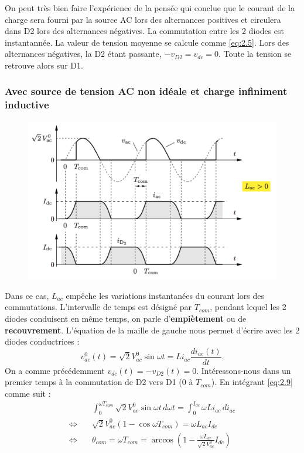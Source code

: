 			On peut très bien faire l'expérience de la pensée qui conclue que le courant de la charge sera fourni par la source AC lors des alternances positives et circulera dans D2 lors des alternances négatives. La commutation entre les 2 diodes est instantannée. La valeur de tension moyenne se calcule comme \eqref{eq:2.5}. Lors des alternances négatives, la D2 étant passante, $-v_{D2} = v_{dc} = 0$. Toute la tension se retrouve alors sur D1.  
			
		\subsubsection{Avec source de tension AC non idéale et charge infiniment inductive}
			\begin{figure}
			\vspace{-5mm}
			\includegraphics[scale=0.3]{ch2/6}
			\end{figure}
			Dans ce cas, $L_{ac}$ empêche les variations instantanées du courant lors des commutations. L'intervalle de temps est désigné par $T_{com}$, pendant lequel les 2 diodes conduisent en même temps, on parle d'\textbf{empiètement} ou de \textbf{recouvrement}. L'équation de la maille de gauche nous permet d'écrire avec les 2 diodes conductrices : 
			\begin{equation}
				v_{ac}^0 (t) = \sqrt{2} V_{ac}^0 \sin \omega t = Li_{ac}\frac{di_{ac}(t)}{dt}.
				\label{eq:2.9}
			\end{equation}
			On a comme précédemment $v_{dc}(t) = - v_{D2}(t) = 0$. Intéressons-nous dans un premier temps à la commutation de D2 vers D1 (0 à $T_{com}$). En intégrant \eqref{eq:2.9} comme suit : 
			\begin{equation}
			\begin{aligned}
				&\int _0 ^{\omega T_{com}} \sqrt{2} V_{ac}^0 \sin \omega t \, d\omega t = \int _0 ^{I_{dc}} \omega Li_{ac}\, di_{ac} \\
				\Leftrightarrow \quad &\sqrt{2} V_{ac}^0 (1- \cos \omega T_{com}) = \omega L_{ac} I_{dc}\\
				\Leftrightarrow \quad &\theta _{com} = \omega T_{com} = \arccos \left( 1 - \frac{\omega L_{ac}}{\sqrt{2} V_{ac}^0}I_{dc} \right)
				\end{aligned}
			\end{equation}			 
